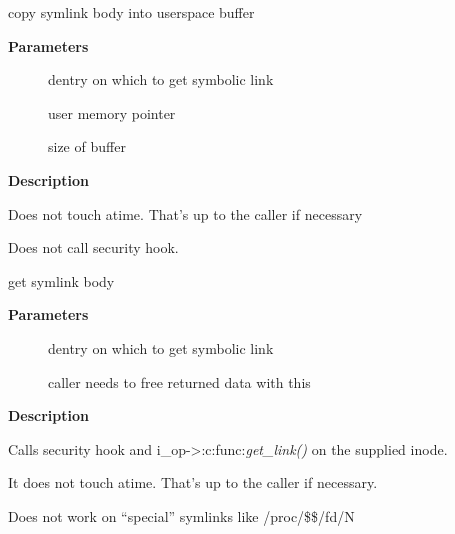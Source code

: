 \documentclass[a4paper,8pt,english]{sphinxmanual}
\begin{document}
\begin{fulllineitems}
\label{filesystems/index:c.vfs_readlink}
copy symlink body into userspace buffer

\end{fulllineitems}


\textbf{Parameters}
\begin{description}
\item[{}] \leavevmode
dentry on which to get symbolic link

\item[{}] \leavevmode
user memory pointer

\item[{}] \leavevmode
size of buffer

\end{description}

\textbf{Description}

Does not touch atime.  That's up to the caller if necessary

Does not call security hook.

\begin{fulllineitems}
\label{filesystems/index:c.vfs_get_link}
get symlink body

\end{fulllineitems}


\textbf{Parameters}
\begin{description}
\item[{}] \leavevmode
dentry on which to get symbolic link

\item[{}] \leavevmode
caller needs to free returned data with this

\end{description}

\textbf{Description}

Calls security hook and i\_op-\textgreater{}:c:func:\emph{get\_link()} on the supplied inode.

It does not touch atime.  That's up to the caller if necessary.

Does not work on ``special'' symlinks like /proc/\$\$/fd/N
\end{document}

